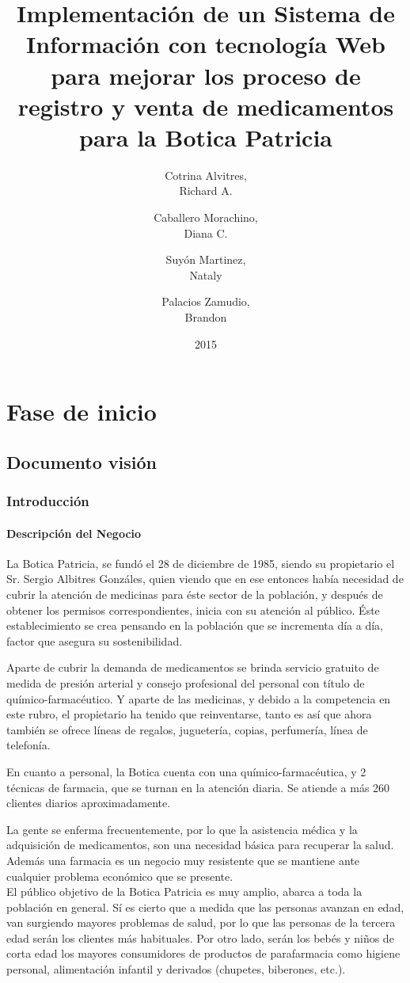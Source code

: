 \documentclass[a4paper,11pt, spanish]{report}
\title{\Huge \textbf{Implementación de un Sistema de Información con tecnología Web para mejorar los proceso de registro y venta de medicamentos para la Botica Patricia\\[3em]}}
\author{
  \Large Cotrina Alvitres,\\
  Richard A.\\[2em]
  \and
  \Large Caballero Morachino,\\
  Diana C.\\[2em]
  \and
  \Large Suyón Martinez, \\
  Nataly\\[2em]
  \and
  \Large Palacios Zamudio, \\
  Brandon\\[2em]
}
\date{\LARGE 2015}
\begin{document}
\maketitle

\tableofcontents
\listoftables
\listoffigures

\part{Fase de inicio}
  \chapter{Documento visión}
    \section{Introducción}
      \subsection{Descripción del Negocio}
        La Botica Patricia, se fundó el 28 de diciembre de 1985, siendo su propietario el Sr. Sergio Albitres Gonzáles, quien viendo que en ese entonces había necesidad de cubrir la atención de medicinas para éste sector de la población, y después de obtener los permisos correspondientes, inicia con su atención al público.         
Éste establecimiento se crea pensando en la población que se incrementa día a día, factor que asegura su sostenibilidad.

Aparte de cubrir la demanda de medicamentos se brinda servicio gratuito de medida de presión arterial y consejo profesional del personal con título de químico-farmacéutico. Y aparte de las medicinas, y debido a la competencia en este rubro, el propietario ha tenido que reinventarse, tanto es así que ahora también se ofrece líneas de regalos, juguetería, copias, perfumería, línea de telefonía.

En cuanto a personal, la Botica cuenta con una químico-farmacéutica, y 2 técnicas de farmacia, que se turnan en la atención diaria. Se atiende a más 260 clientes diarios aproximadamente.

La gente se enferma frecuentemente, por lo que la asistencia médica y la adquisición de medicamentos, son una necesidad básica para recuperar la salud. Además una farmacia es un negocio muy resistente que se mantiene ante cualquier problema económico que se presente. \\
El público objetivo de la Botica Patricia es muy amplio, abarca a toda la población en general. Sí es cierto que a medida que las personas avanzan en edad, van surgiendo mayores problemas de salud, por lo que las personas de la tercera edad serán los clientes más habituales.
Por otro lado, serán los bebés y niños de corta edad los mayores consumidores de productos de parafarmacia como higiene personal, alimentación infantil y derivados (chupetes, biberones, etc.).
\end{document}
